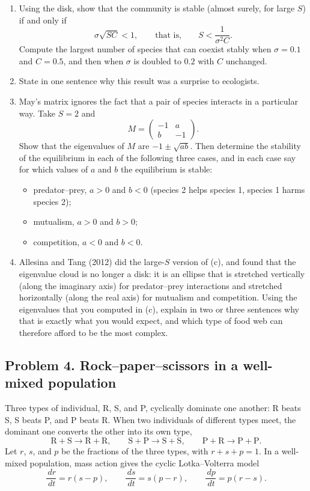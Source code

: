 \documentclass[a4paper,12pt]{article}
\newcommand{\dd}{\,d}
\begin{document}
\begin{enumerate}[label=(\alph*)]
\item Using the disk, show that the community is stable (almost surely, for large $S$) if and only if
\[ \sigma\sqrt{SC} < 1,
\qquad\text{that is,}\qquad
S < \frac{1}{\sigma^2 C} . \]
Compute the largest number of species that can coexist stably when $\sigma=0.1$ and $C=0.5$, and then when $\sigma$ is doubled to $0.2$ with $C$ unchanged.

\item State in one sentence why this result was a surprise to ecologists.

\item May's matrix ignores the fact that a pair of species interacts in a particular way. Take $S=2$ and
\[ M = \begin{pmatrix} -1 & a\\ b & -1 \end{pmatrix} . \]
Show that the eigenvalues of $M$ are $-1 \pm \sqrt{ab}$. Then determine the stability of the equilibrium in each of the following three cases, and in each case say for which values of $a$ and $b$ the equilibrium is stable:
	\begin{itemize}
	\item predator--prey, $a>0$ and $b<0$ (species 2 helps species 1, species 1 harms species 2);
	\item mutualism, $a>0$ and $b>0$;
	\item competition, $a<0$ and $b<0$.
	\end{itemize}

\item Allesina and Tang (2012) did the large-$S$ version of (c), and found that the eigenvalue cloud is no longer a disk: it is an ellipse that is stretched vertically (along the imaginary axis) for predator--prey interactions and stretched horizontally (along the real axis) for mutualism and competition. Using the eigenvalues that you computed in (c), explain in two or three sentences why that is exactly what you would expect, and which type of food web can therefore afford to be the most complex.
\end{enumerate}

\subsection*{Problem 4. Rock--paper--scissors in a well-mixed population}

Three types of individual, R, S, and P, cyclically dominate one another: R beats S, S beats P, and P beats R. When two individuals of different types meet, the dominant one converts the other into its own type,
\[ \text{R}+\text{S} \to \text{R}+\text{R},
\qquad
\text{S}+\text{P} \to \text{S}+\text{S},
\qquad
\text{P}+\text{R} \to \text{P}+\text{P} . \]
Let $r$, $s$, and $p$ be the fractions of the three types, with $r+s+p=1$. In a well-mixed population, mass action gives the cyclic Lotka--Volterra model
\[
\frac{\dd r}{\dd t} = r\left( s-p \right),
\qquad
\frac{\dd s}{\dd t} = s\left( p-r \right),
\qquad
\frac{\dd p}{\dd t} = p\left( r-s \right).
\]
\end{document}
